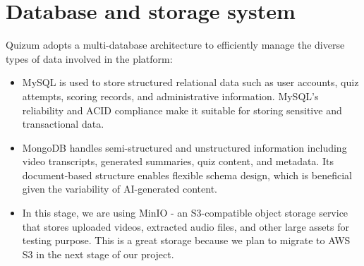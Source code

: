 \section{Database and storage system}
Quizum adopts a multi-database architecture to efficiently manage the diverse types of data involved in the platform:
\begin{itemize}
    \item MySQL is used to store structured relational data such as user accounts, quiz attempts, scoring records, and administrative information. MySQL’s reliability and ACID compliance make it suitable for storing sensitive and transactional data.
    \item MongoDB handles semi-structured and unstructured information including video transcripts, generated summaries, quiz content, and metadata. Its document-based structure enables flexible schema design, which is beneficial given the variability of AI-generated content.
    \item In this stage, we are using MinIO - an S3-compatible object storage service that stores uploaded videos, extracted audio files, and other large assets for testing purpose. This is a great storage because we plan to migrate to AWS S3 in the next stage of our project.
\end{itemize}